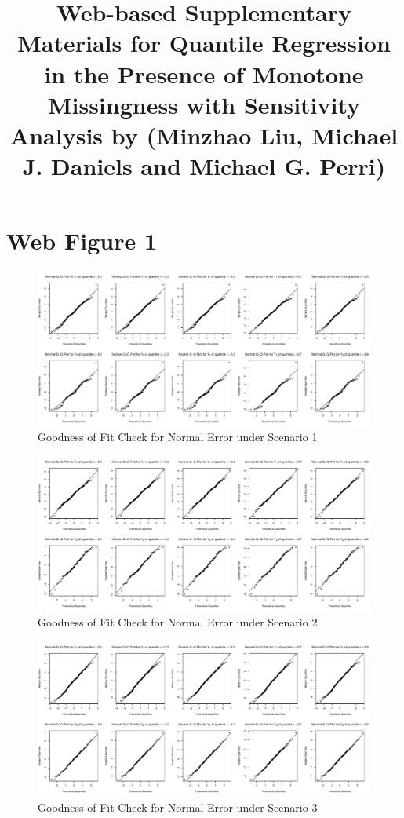\documentclass{article}
\title{Web-based Supplementary Materials for Quantile Regression in the Presence of Monotone Missingness with Sensitivity Analysis by (Minzhao Liu, Michael J. Daniels and Michael G. Perri)}
\begin{document}
\maketitle

\section{Web  Figure 1}

\begin{figure}[h]
\centerline{\includegraphics[scale=.4]{../image/NormalS1}}
\caption{Goodness of Fit Check for Normal Error under Scenario 1}
\end{figure}

\begin{figure}[h]
\centerline{\includegraphics[scale=.4]{../image/NormalS2}}
\caption{Goodness of Fit Check for Normal Error under Scenario 2}
\end{figure}

\begin{figure}[h]
\centerline{\includegraphics[scale=.4]{../image/NormalS3}}
\caption{Goodness of Fit Check for Normal Error under Scenario 3}
\end{figure}
\end{document}

